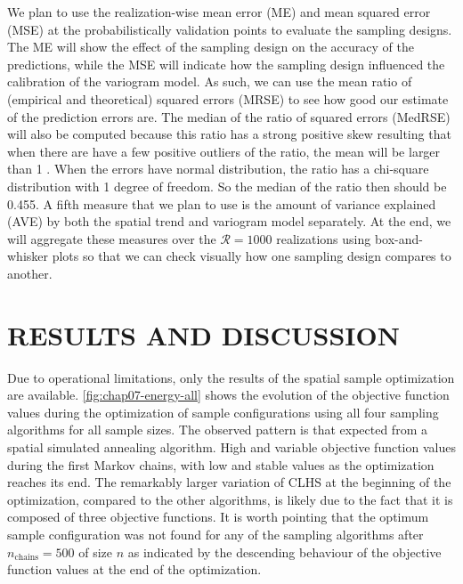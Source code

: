 We plan to use the realization-wise mean error (ME) and mean squared error (MSE) at the probabilistically 
validation points to evaluate the sampling designs. The ME will show the effect of the sampling design 
on the accuracy of the predictions, while the MSE will indicate how the sampling design influenced the 
calibration of the variogram model. As such, we can use the mean ratio of (empirical and theoretical) squared 
errors (MRSE) to see how good our estimate of the prediction errors are. The median of the ratio of squared 
errors (MedRSE) will also be computed because this ratio has a strong positive skew resulting that when there 
are have a few positive outliers of the ratio, the mean will be larger than 1 \cite{Lark2000a}. When the errors 
have normal distribution, the ratio has a chi-square distribution with 1 degree of freedom. So the median of 
the ratio then should be 0.455. A fifth measure that we plan to use is the amount of variance explained (AVE) 
by both the spatial trend and variogram model separately. At the end, we will aggregate these measures over the 
$\mathcal{R} = 1000$ realizations using box-and-whisker plots so that we can check visually how one sampling 
design compares to another.

\section{RESULTS AND DISCUSSION}

Due to operational limitations, only the results of the spatial sample optimization are available. 
\autoref{fig:chap07-energy-all} shows the evolution of the objective function values during the optimization 
of sample configurations using all four sampling algorithms for all sample sizes. The observed pattern is that 
expected from a spatial simulated annealing algorithm. High and variable objective function values during the 
first Markov chains, with low and stable values as the optimization reaches its end. The remarkably larger 
variation of CLHS at the beginning of the optimization, compared to the other algorithms, is likely due to the 
fact that it is composed of three objective functions. It is worth pointing that the optimum sample 
configuration was not found for any of the sampling algorithms after $n_\text{chains} = 500$ of size $n$ as 
indicated by the descending behaviour of the objective function values at the end of the optimization.

